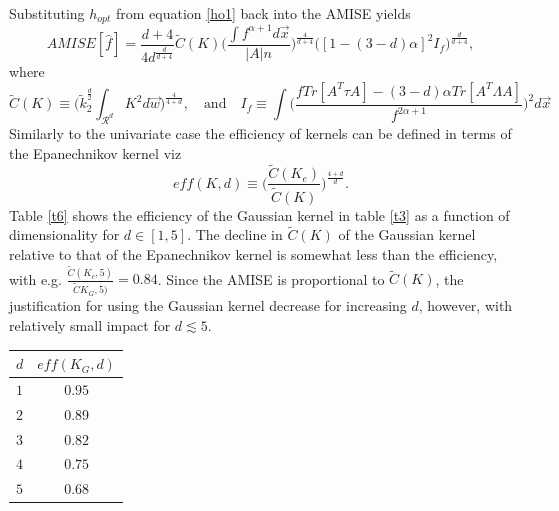 \documentclass[
twoside,
openright,
titlepage,
numbers=noenddot,
headinclude,%
footinclude=true,
dottedtoc, %
ngerman,
american, %
pagesize=pdftex,
]{book}
\begin{document}
	Substituting $h_{opt}$ from equation \eqref{ho1} back into the AMISE yields
	\begin{equation}
		AMISE[\hat{f}]= \frac{d+4}{4d^\frac{d}{d+4}}\tilde{C}(K)\bigg(\frac{\int f^{\alpha+1}d\vec{x} }{|A|n}\bigg)^\frac{4}{d+4}\bigg([1-(3-d)\alpha]^2I_f\bigg)^\frac{d}{d+4}
		,
		\label{misec3}
	\end{equation}
	where
	\begin{equation}
		\tilde{C}(K)\equiv \bigg(\tilde{k}_2^\frac{d}{2}\int_{\mathcal{R}^d} K^2d\vec{w}\bigg)^{\frac{4}{4+d}}, \quad \text{and}\quad I_f\equiv\int \bigg(\frac{fTr[A^T\tau A]-(3-d)\alpha Tr[A^T\Lambda A]}{f^{2\alpha+1}}\bigg)^2d\vec{x}
		\label{cck}
	\end{equation}
	Similarly to the univariate case the efficiency of kernels can be defined in terms of the Epanechnikov kernel viz
	\begin{equation}
		eff(K,d)\equiv \bigg(\frac{\tilde{C}(K_e)}{\tilde{C}(K)}\bigg)^\frac{4+d}{d}.
	\end{equation}
	Table \ref{t6} shows the efficiency of the Gaussian kernel in table \ref{t3} as a function of dimensionality for $d\in [1,5]$. The decline in $\tilde{C}(K)$ of the Gaussian kernel relative to that of the Epanechnikov kernel is somewhat less than the efficiency, with e.g. $\frac{\tilde{C}(K_e,5)}{\tilde{C}K_G,5)}=0.84$. Since the AMISE is proportional to $\tilde{C}(K)$, the justification for using the Gaussian kernel decrease for increasing $d$, however, with relatively small impact for $d\lesssim 5$. 
	\begin{center}
		\begin{tabular}{ l|| c|}
			$d$ & $eff(K_G,d)$ \\
			\hline
			$1$ & $0.95$  \\
			$2$ & $0.89$ \\
			$3$ & $0.82$\\
			$4$ & $0.75$\\
			$5$ & $0.68$\\
		\end{tabular}
		\captionsetup{width=0.95\textwidth}
		\label{t6}
	\end{center}
	
\end{document}
